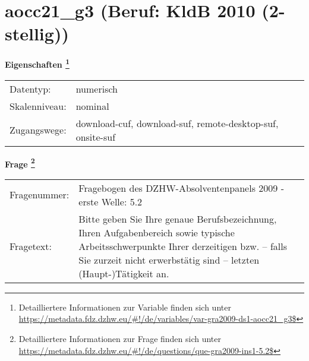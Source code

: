 
    \setcounter{footnote}{0}

    \vspace*{-1.8cm}
	\section{aocc21\_g3 (Beruf: KldB 2010 (2-stellig))}
	\label{section:aocc21_g3}



    \vspace*{0.5cm}
    \noindent\textbf{Eigenschaften
	\footnote{Detailliertere Informationen zur Variable finden sich unter
		\url{https://metadata.fdz.dzhw.eu/\#!/de/variables/var-gra2009-ds1-aocc21_g3$}}}\\
	\begin{tabularx}{\hsize}{@{}lX}
	Datentyp: & numerisch \\
	Skalenniveau: & nominal \\
	Zugangswege: &
	  download-cuf, 
	  download-suf, 
	  remote-desktop-suf, 
	  onsite-suf
 \\
    \end{tabularx}



				\vspace*{0.5cm}
                \noindent\textbf{Frage
	                \footnote{Detailliertere Informationen zur Frage finden sich unter
		              \url{https://metadata.fdz.dzhw.eu/\#!/de/questions/que-gra2009-ins1-5.2$}}}\\
				\begin{tabularx}{\hsize}{@{}lX}
					Fragenummer: &
					  Fragebogen des DZHW-Absolventenpanels 2009 - erste Welle:
					  5.2
 \\
					Fragetext: & Bitte geben Sie Ihre genaue Berufsbezeichnung, Ihren Aufgabenbereich sowie typische Arbeitsschwerpunkte Ihrer derzeitigen bzw. – falls Sie zurzeit nicht erwerbstätig sind – letzten (Haupt-)Tätigkeit an. \\
				\end{tabularx}





